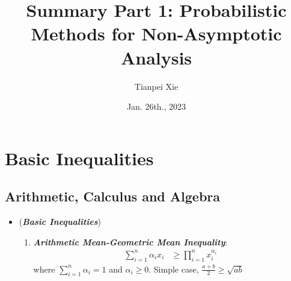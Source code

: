 \documentclass[11pt]{article}
\begin{document}
\title{Summary Part 1: Probabilistic Methods for Non-Asymptotic Analysis}
\author{ Tianpei Xie}
\date{Jan. 26th., 2023 }
\maketitle
\tableofcontents
\newpage
\section{Basic Inequalities}
\subsection{Arithmetic, Calculus and Algebra}
\begin{itemize}
\item \begin{remark} (\textbf{\emph{Basic Inequalities}}) 
\begin{enumerate}
\item \textbf{\emph{Arithmetic Mean-Geometric Mean Inequality}}:
\begin{align*}
\sum_{i=1}^n \alpha_i x_i &\ge \prod_{i=1}^{n}x_i^{\alpha_i}
\end{align*} where $\sum_{i=1}^{n}\alpha_i = 1$ and $\alpha_i \ge 0$. Simple case, $\frac{a + b}{2} \ge \sqrt{ab}$


\end{enumerate}
\end{remark}
\end{itemize}
\end{document}
